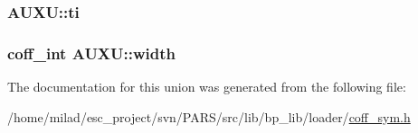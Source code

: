 \label{unionAUXU_a94430b9767d7cdd6319772ede408e526}
\hypertarget{unionAUXU_aeed8d219ef07fd07c30c04690e566191}{
\subsubsection[{ti}]{ {\bf AUXU::ti}}}
\label{unionAUXU_aeed8d219ef07fd07c30c04690e566191}
\hypertarget{unionAUXU_a9c1651961315a871bd30484de8df7818}{
\subsubsection[{width}]{\setlength{\rightskip}{0pt plus 5cm}coff\_\-int {\bf AUXU::width}}}
\label{unionAUXU_a9c1651961315a871bd30484de8df7818}


The documentation for this union was generated from the following file:\begin{DoxyCompactItemize}
\item 
/home/milad/esc\_\-project/svn/PARS/src/lib/bp\_\-lib/loader/\hyperlink{coff__sym_8h}{coff\_\-sym.h}\end{DoxyCompactItemize}

